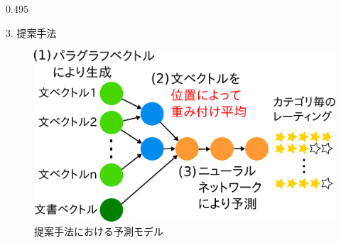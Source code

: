 \documentclass[unicode,10pt]{beamer}
\newcommand{\mycolumnwidth}{0.495\textwidth}
\begin{document}
\begin{frame}
\begin{columns}[onlytextwidth,t]
\begin{column}{\mycolumnwidth}
\begin{block}{3. 提案手法}
\begin{figure}
      \includegraphics[width=0.9\linewidth]
                      {fig/model_with_detailed_processes.pdf}
      \caption*{提案手法における予測モデル}
    \end{figure}


\end{block}
\end{column}
\end{columns}
\end{frame}
\end{document}
